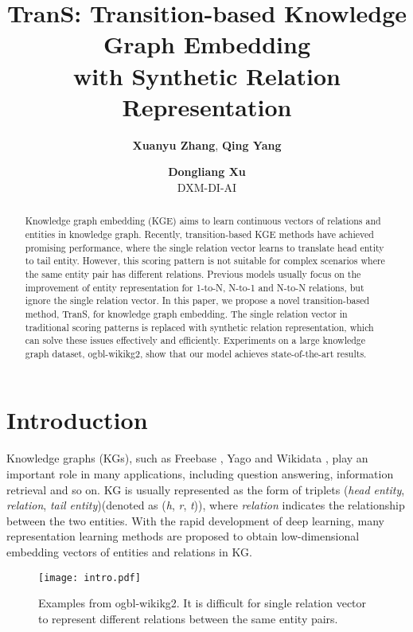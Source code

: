 \documentclass[11pt]{article}
\title{TranS: Transition-based Knowledge Graph Embedding \\ with Synthetic Relation Representation}
\author{{\bf Xuanyu Zhang}, {\bf Qing Yang} \and {\bf Dongliang Xu} \\
        DXM-DI-AI
        }
\begin{document}
\maketitle
\begin{abstract}
Knowledge graph embedding (KGE) aims to learn continuous vectors of relations and entities in knowledge graph. Recently, transition-based KGE methods have achieved promising performance, where the single relation vector learns to translate head entity to tail entity. However, this scoring pattern is not suitable for complex scenarios where the same entity pair has different relations. Previous models usually focus on the improvement of entity representation for 1-to-N, N-to-1 and N-to-N relations, but ignore the single relation vector. In this paper, we propose a novel transition-based method, TranS, for knowledge graph embedding. The single relation vector in traditional scoring patterns is replaced with synthetic relation representation, which can solve these issues effectively and efficiently. Experiments on a large knowledge graph dataset, ogbl-wikikg2, show that our model achieves state-of-the-art results.
\end{abstract}

\section{Introduction}
Knowledge graphs (KGs), such as Freebase \cite{bollacker2008freebase}, Yago \cite{rebele2016yago} and Wikidata \cite{vrandevcic2014wikidata}, play an important role in many applications, including question answering, information retrieval and so on. KG is usually represented as the form of triplets (\textit{head entity}, \textit{relation}, \textit{tail entity})(denoted as (\textit{h}, \textit{r}, \textit{t})), where \textit{relation} 
indicates the relationship between the two entities. With the rapid development of deep learning,
many representation learning methods \cite{bordes2013translating,wang2014knowledge,fan2014transition,lin2015learning,ji2015knowledge,ji2016knowledge,xie2017interpretable,qian2018translating,chao2020pairre,long2021triplere,chen2021relation,wang2022interht} are proposed to obtain  low-dimensional embedding vectors of entities and relations in KG.

\begin{figure}[t]
\begin{center}
\texttt{[image: intro.pdf]}
\caption{Examples from ogbl-wikikg2. It is difficult for single relation vector to represent different relations between the same entity pairs.
}\label{intro}
\end{center}
\end{figure}
\end{document}
